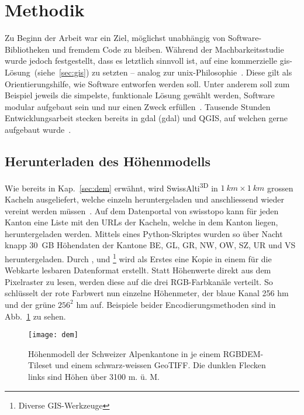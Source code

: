 \vfill

\pagebreak


\section{Methodik}

Zu Beginn der Arbeit war ein Ziel, möglichst unabhängig von Software-Bibliotheken und fremdem Code zu bleiben. Während der Machbarkeitsstudie wurde jedoch festgestellt, dass es letztlich sinnvoll ist, auf eine kommerzielle \acrshort{gis}-Lösung~(siehe~\ref{sec:gis}) zu setzten -- analog zur \acrshort{unix}-Philosophie~\cite{unixphil}. Diese gilt als Orientierungshilfe, wie Software entworfen werden soll. Unter anderem soll zum Beispiel jeweils die simpelste, funktionale Lösung gewählt werden, Software modular aufgebaut sein und nur einen Zweck erfüllen~\cite{unixphil}. Tausende Stunden Entwicklungsarbeit stecken bereits in \acrshort{gdal} (\acrlong{gdal}) und QGIS, auf welchen gerne aufgebaut wurde~\cite{gdalmanual}\cite{qgis}.
\subsection{Herunterladen des Höhenmodells}

Wie bereits in Kap.\ \ref{sec:dem} erwähnt, wird SwissAlti\textsuperscript{3D} in $\qty{1}{km} \times \qty{1}{km}$ grossen Kacheln ausgeliefert, welche einzeln heruntergeladen und anschliessend wieder vereint werden müssen~\cite{alti3dprod}. Auf dem Datenportal von swisstopo kann für jeden Kanton eine Liste mit den URLs der Kacheln, welche in dem Kanton liegen, heruntergeladen werden. Mittels eines Python-Skriptes wurden so über Nacht knapp \qty{30}{GB} Höhendaten der Kantone BE, GL, GR, NW, OW, SZ, UR und VS heruntergeladen. Durch ,  und \footnote{Diverse GIS-Werkzeuge} wird als Erstes eine Kopie in einem für die Webkarte lesbaren Datenformat erstellt. Statt Höhenwerte direkt aus dem Pixelraster zu lesen, werden diese auf die drei RGB-Farbkanäle verteilt. So schlüsselt der rote Farbwert nun einzelne Höhenmeter, der blaue Kanal 256 hm und der grüne $256^2$ hm auf. Beispiele beider Encodierungsmethoden sind in Abb.\ \ref{fig:dem} zu sehen.

\begin{figure}[H]
  \centering
  \texttt{[image: dem]}
  \caption{Höhenmodell der Schweizer Alpenkantone in je einem RGBDEM-Tileset und einem schwarz-weissen GeoTIFF. Die dunklen Flecken links sind Höhen über 3100 m. ü. M.}\label{fig:dem}
\end{figure}

